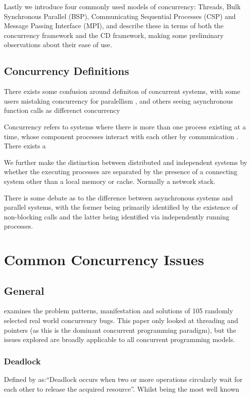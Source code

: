\documentclass{sig-alternate}
\begin{document}
Lastly we introduce four commonly used models of concurrency: Threads, Bulk Synchronous Parallel (BSP), Communicating Sequential Processes (CSP) and Message Passing Interface (MPI), and describe these in terms of both the concurrency framework and the CD framework, making some preliminary observations about their ease of use.

\subsection{Concurrency Definitions}
There exists some confusion around definiton of concurrent systems, with some users mistaking concurrency for paralellism \cite{pike13:_concur_paral}, and others seeing asynchronous function calls as differenct concurrency

Concurrency refers to systems where there is more than one process existing at a time, whose component processes interact with each other by communication \cite{tpc}.
There exists a 

We further make the distinction between distributed and independent systems by whether the executing processes are separated by the presence of a connecting system other than a local memory or cache. Normally a network stack.

There is some debate as to the difference between asynchronous systems and parallel systems, with the former being primarily identified by the existence of non-blocking calls and the latter being identified via independently running processes.

\section{Common Concurrency Issues}
\subsection{General}
\cite{shanlu08:_learn_mistak_compr_study_real} examines the problem patterns, manifestation and solutions of 105 randomly selected real world concurrency bugs. This paper only looked at threading and pointers (as this is the dominant concurrent programming paradigm), but the issues explored are broadly applicable to all concurrent programming models.

\subsubsection{Deadlock}
Defined by \cite{shanlu08:_learn_mistak_compr_study_real} as:``Deadlock occurs when two or more operations circularly wait for each other to release the acquired resource''. Whilst being the most well known 
\end{document}
